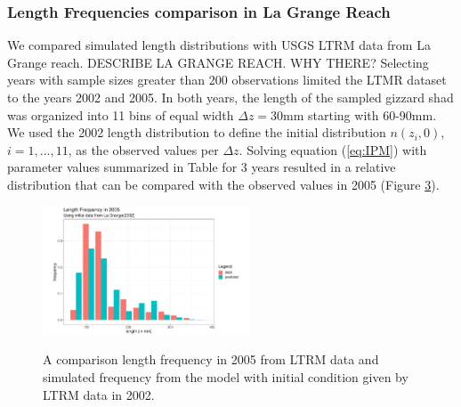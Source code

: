 \documentclass[11pt,oneside]{amsart}
\def\ds{\displaystyle}
\theoremstyle{definition}
\begin{document}
\begin{figure}
\begin{subfigure}[b]{.3\textwidth}
     \caption{}
\label{}  
\end{subfigure}
\end{figure}    



\subsubsection{Length Frequencies comparison in La Grange Reach}


We compared simulated length distributions with USGS LTRM data from La Grange reach. DESCRIBE LA GRANGE REACH.  WHY THERE?  Selecting years with sample sizes greater than 200 observations limited the LTMR dataset to the years 2002 and 2005. In both years, the length of the sampled gizzard shad was organized into 11 bins of equal width $\Delta z = 30\mbox{mm}$ starting with 60-90mm.  We used the 2002 length distribution to define the initial distribution $\ds n(z_i,0)$, $i=1,...,11$, as the observed values per $\Delta z$. Solving equation (\ref{eq:IPM}) with parameter values summarized in Table \label{table:parameters} for 3 years resulted in a relative distribution that can be compared with the observed values in 2005 (Figure \ref{fig:LGdata_sim}).

\begin{figure}
\centering
   \includegraphics[width=0.55\textwidth]{figures/Figure3.pdf}
\label{fig:LGdata_sim}
\caption{A comparison length frequency in 2005 from LTRM data and simulated frequency from the model with initial condition given by LTRM data in 2002.}

\end{figure}    
\end{document}
